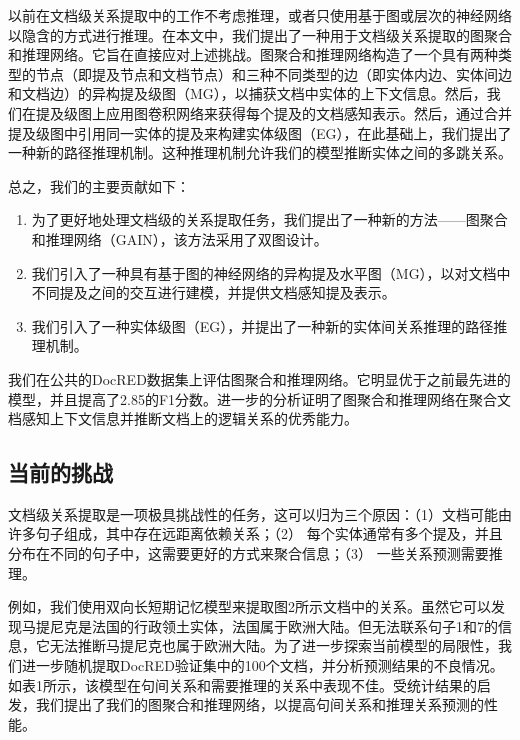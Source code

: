 \documentclass[bachelor]{thesis-uestc}
\begin{document}
以前在文档级关系提取中的工作不考虑推理，或者只使用基于图或层次的神经网络以隐含的方式进行推理。在本文中，我们提出了一种用于文档级关系提取的图聚合和推理网络。它旨在直接应对上述挑战。图聚合和推理网络构造了一个具有两种类型的节点（即提及节点和文档节点）和三种不同类型的边（即实体内边、实体间边和文档边）的异构提及级图（MG），以捕获文档中实体的上下文信息。然后，我们在提及级图上应用图卷积网络来获得每个提及的文档感知表示。然后，通过合并提及级图中引用同一实体的提及来构建实体级图（EG），在此基础上，我们提出了一种新的路径推理机制。这种推理机制允许我们的模型推断实体之间的多跳关系。\par

总之，我们的主要贡献如下：\par

\begin{enumerate}

    \item 为了更好地处理文档级的关系提取任务，我们提出了一种新的方法——图聚合和推理网络（GAIN），该方法采用了双图设计。
    \item 我们引入了一种具有基于图的神经网络的异构提及水平图（MG），以对文档中不同提及之间的交互进行建模，并提供文档感知提及表示。
    \item 我们引入了一种实体级图（EG），并提出了一种新的实体间关系推理的路径推理机制。
\end{enumerate}

我们在公共的DocRED数据集上评估图聚合和推理网络。它明显优于之前最先进的模型，并且提高了2.85的F1分数。进一步的分析证明了图聚合和推理网络在聚合文档感知上下文信息并推断文档上的逻辑关系的优秀能力。\par

\subsection{当前的挑战}
文档级关系提取是一项极具挑战性的任务，这可以归为三个原因：（1）文档可能由许多句子组成，其中存在远距离依赖关系；（2） 每个实体通常有多个提及，并且分布在不同的句子中，这需要更好的方式来聚合信息；（3） 一些关系预测需要推理。\par

例如，我们使用双向长短期记忆模型来提取图2所示文档中的关系。虽然它可以发现马提尼克是法国的行政领土实体，法国属于欧洲大陆。但无法联系句子1和7的信息，它无法推断马提尼克也属于欧洲大陆。为了进一步探索当前模型的局限性，我们进一步随机提取DocRED验证集中的100个文档，并分析预测结果的不良情况。如表1所示，该模型在句间关系和需要推理的关系中表现不佳。受统计结果的启发，我们提出了我们的图聚合和推理网络，以提高句间关系和推理关系预测的性能。\par
\end{document}
